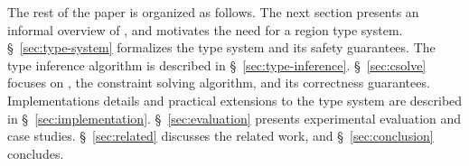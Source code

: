 The rest of the paper is organized as follows. The next section
presents an informal overview of \name, and motivates the need for a
region type system.  \S~\ref{sec:type-system} formalizes the type
system and its safety guarantees. The type inference algorithm is
described in \S~\ref{sec:type-inference}. \S~\ref{sec:csolve} focuses
on \csolve, the constraint solving algorithm, and its correctness
guarantees.  Implementations details and practical extensions to the
type system are described in \S~\ref{sec:implementation}.
\S~\ref{sec:evaluation} presents experimental evaluation and case
studies.  \S~\ref{sec:related} discusses the related work, and
\S~\ref{sec:conclusion} concludes.
